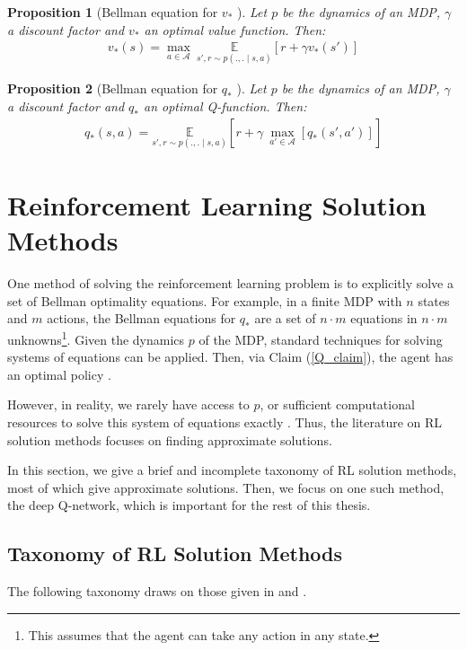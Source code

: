 \documentclass[11pt, a4paper, bibliography=totoc]{report}
\newtheorem{proposition}{Proposition}
\begin{document}
\begin{proposition}[Bellman equation for $ v_* $ {\cite[p.~63]{Sutton2018}}]
	Let $ p $ be the dynamics of an MDP, $ \gamma $ a discount factor and $ v_* $ an optimal value function. Then:
	\begin{align}
	v_*(s) = \max_{a \in \mathcal{A}} ~ \underset{s', r \sim p(., . \mid s, a)}{\mathbb{E}} \left[ r + \gamma v_*(s') \right]
	\end{align}
\end{proposition}

\begin{proposition}[Bellman equation for $ q_* $ {\cite[p.~63]{Sutton2018}}] \label{bellman_q*}
	Let $ p $ be the dynamics of an MDP, $ \gamma $ a discount factor and $ q_* $ an optimal Q-function. Then:
	\begin{align}
	q_*(s, a) = \underset{s', r \sim p(., . \mid s, a)}{\mathbb{E}} \left[ r + \gamma ~ \underset{a' \in \mathcal{A}}{\max}\left[q_*(s', a')\right] \right]
	\end{align}
\end{proposition}

\section{Reinforcement Learning Solution Methods} \label{RL_solution_methods}
One method of solving the reinforcement learning problem is to explicitly solve a set of Bellman optimality equations. For example, in a finite MDP with $ n $ states and $ m $ actions, the Bellman equations for $ q_* $ are a set of $ n\cdot m $ equations in $ n\cdot m $ unknowns\footnote{This assumes that the agent can take any action in any state.}. Given the dynamics $ p $ of the MDP, standard techniques for solving systems of equations can be applied. Then, via Claim (\ref{Q_claim}), the agent has an optimal policy \cite[p.~64]{Sutton2018}.

However, in reality, we rarely have access to $ p $, or sufficient computational resources to solve this system of equations exactly \cite[p.~66]{Sutton2018}. Thus, the literature on RL solution methods focuses on finding approximate solutions.

In this section, we give a brief and incomplete taxonomy of RL solution methods, most of which give approximate solutions. Then, we focus on one such method, the deep Q-network, which is important for the rest of this thesis.

\subsection{Taxonomy of RL Solution Methods}
The following taxonomy draws on those given in \cite{Sutton2018} and \cite{Achiam2019}.
\end{document}
